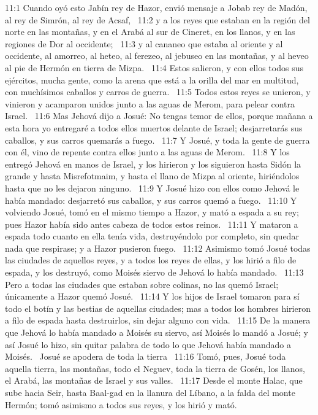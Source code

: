 11:1 Cuando oyó esto Jabín rey de Hazor, envió mensaje a Jobab rey de Madón, al rey de Simrón, al rey de Acsaf,  
11:2 y a los reyes que estaban en la región del norte en las montañas, y en el Arabá al sur de Cineret, en los llanos, y en las regiones de Dor al occidente;  
11:3 y al cananeo que estaba al oriente y al occidente, al amorreo, al heteo, al ferezeo, al jebuseo en las montañas, y al heveo al pie de Hermón en tierra de Mizpa.  
11:4 Estos salieron, y con ellos todos sus ejércitos, mucha gente, como la arena que está a la orilla del mar en multitud, con muchísimos caballos y carros de guerra.  
11:5 Todos estos reyes se unieron, y vinieron y acamparon unidos junto a las aguas de Merom, para pelear contra Israel.  
11:6 Mas Jehová dijo a Josué: No tengas temor de ellos, porque mañana a esta hora yo entregaré a todos ellos muertos delante de Israel; desjarretarás sus caballos, y sus carros quemarás a fuego.  
11:7 Y Josué, y toda la gente de guerra con él, vino de repente contra ellos junto a las aguas de Merom.  
11:8 Y los entregó Jehová en manos de Israel, y los hirieron y los siguieron hasta Sidón la grande y hasta Misrefotmaim, y hasta el llano de Mizpa al oriente, hiriéndolos hasta que no les dejaron ninguno.  
11:9 Y Josué hizo con ellos como Jehová le había mandado: desjarretó sus caballos, y sus carros quemó a fuego.  
11:10 Y volviendo Josué, tomó en el mismo tiempo a Hazor, y mató a espada a su rey; pues Hazor había sido antes cabeza de todos estos reinos.  
11:11 Y mataron a espada todo cuanto en ella tenía vida, destruyéndolo por completo, sin quedar nada que respirase; y a Hazor pusieron fuego.  
11:12 Asimismo tomó Josué todas las ciudades de aquellos reyes, y a todos los reyes de ellas, y los hirió a filo de espada, y los destruyó, como Moisés siervo de Jehová lo había mandado.  
11:13 Pero a todas las ciudades que estaban sobre colinas, no las quemó Israel; únicamente a Hazor quemó Josué.  
11:14 Y los hijos de Israel tomaron para sí todo el botín y las bestias de aquellas ciudades; mas a todos los hombres hirieron a filo de espada hasta destruirlos, sin dejar alguno con vida.  
11:15 De la manera que Jehová lo había mandado a Moisés su siervo, así Moisés lo mandó a Josué; y así Josué lo hizo, sin quitar palabra de todo lo que Jehová había mandado a Moisés.  
Josué se apodera de toda la tierra  
11:16 Tomó, pues, Josué toda aquella tierra, las montañas, todo el Neguev, toda la tierra de Gosén, los llanos, el Arabá, las montañas de Israel y sus valles.  
11:17 Desde el monte Halac, que sube hacia Seir, hasta Baal-gad en la llanura del Líbano, a la falda del monte Hermón; tomó asimismo a todos sus reyes, y los hirió y mató.  
